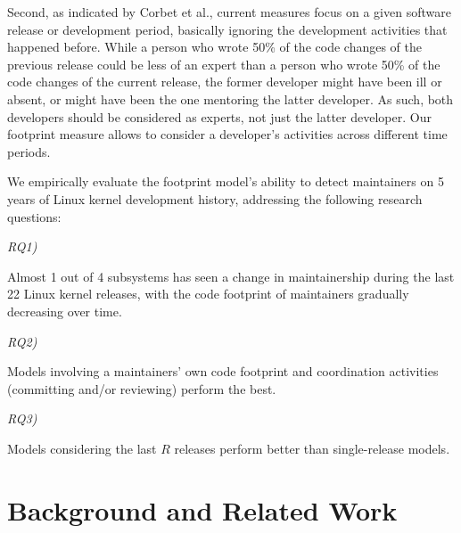 Second, as indicated by Corbet et al., current measures focus on a given software release or development period, basically ignoring the development activities that happened before.
While a person who wrote 50\% of the code changes of the previous release could be less of an expert than a person who
wrote 50\% of the code changes of the current release, the former developer might have been ill or absent, or might have been the one mentoring the latter developer. As such, both developers should be considered as experts, not just the latter developer. Our footprint measure allows to consider a developer's activities across different time periods.

We empirically evaluate the footprint model's ability to detect maintainers on 5 years of Linux kernel development history, addressing the following research questions:



\begin{description}
\item[\textit{RQ1)}] \textit{\rqone }
\end{description}

\begin{myindentpar}{1cm}
Almost 1 out of 4 subsystems has seen a change in maintainership during the last 22 Linux kernel releases, with the code footprint of maintainers gradually decreasing over time.
\end{myindentpar}

\begin{description}
\item[\textit{RQ2)}] \textit{\rqtwo }
\end{description}

\begin{myindentpar}{1cm}
Models involving a maintainers' own code footprint and coordination activities (committing and/or reviewing) perform the best.
\end{myindentpar}

\begin{description}
\item[\textit{RQ3)}] \textit{\rqthree }
\end{description}

\begin{myindentpar}{1cm}
Models considering the last $R$ releases perform better than single-release models.
\end{myindentpar}


\section{Background and Related Work}
\label{sec:backgr-relat-work} 

